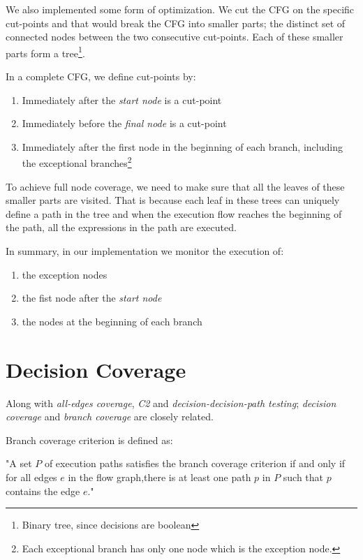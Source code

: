\documentclass[12pt,a4paper]{report}
\begin{document}
We also implemented some form of optimization. We cut the CFG on the specific cut-points and that would break the CFG into smaller parts; the distinct set of connected nodes between the two consecutive cut-points. Each of these smaller parts form a tree\footnote{Binary tree, since decisions are boolean}.

In a complete CFG, we define cut-points by:  

\begin{enumerate}
 \item Immediately after the \emph{start node} is a cut-point
 \item Immediately before the \emph{final node} is a cut-point
 \item Immediately after the first node in the beginning of each branch, including the exceptional branches\footnote{Each exceptional branch has only one node which is the exception node.} 
\end{enumerate}

To achieve full node coverage, we need to make sure that all the leaves of these smaller parts are visited. That is because each leaf in these trees can uniquely define a path in the tree and when the execution flow reaches the beginning of the path, all the expressions in the path are executed.

In summary, in our implementation we monitor the execution of:

\begin{enumerate}
 \item the exception nodes
 \item the fist node after the \emph{start node}
 \item the nodes at the beginning of each branch
\end{enumerate}

\section{Decision Coverage}
Along with \emph{all-edges coverage}, \emph{C2} and \emph{decision-decision-path testing}; \emph{decision coverage} and \emph{branch coverage} are closely related.

Branch coverage criterion is defined as:

"A set $P$ of execution paths satisfies the branch coverage criterion if and only if for all edges $e$ in the flow graph,there is at least one path $p$ in $P$ such that $p$ contains the edge $e$."\cite{Zhu:1997:SUT:267580.267590}
\end{document}
